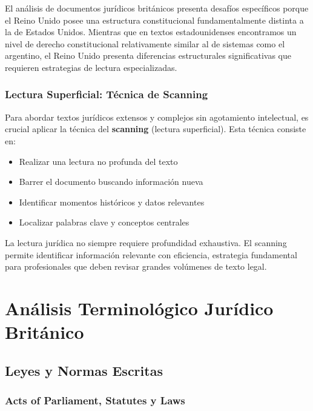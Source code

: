 \documentclass[12pt,oneside]{book}
\begin{document}
El análisis de documentos jurídicos británicos presenta desafíos específicos porque el Reino Unido posee una estructura constitucional fundamentalmente distinta a la de Estados Unidos. Mientras que en textos estadounidenses encontramos un nivel de derecho constitucional relativamente similar al de sistemas como el argentino, el Reino Unido presenta diferencias estructurales significativas que requieren estrategias de lectura especializadas.

\subsection{Lectura Superficial: Técnica de Scanning}

Para abordar textos jurídicos extensos y complejos sin agotamiento intelectual, es crucial aplicar la técnica del \textbf{scanning} (lectura superficial). Esta técnica consiste en:

\begin{itemize}
    \item Realizar una lectura no profunda del texto
    \item Barrer el documento buscando información nueva
    \item Identificar momentos históricos y datos relevantes
    \item Localizar palabras clave y conceptos centrales
\end{itemize}

La lectura jurídica no siempre requiere profundidad exhaustiva. El scanning permite identificar información relevante con eficiencia, estrategia fundamental para profesionales que deben revisar grandes volúmenes de texto legal.


\chapter{Análisis Terminológico Jurídico Británico}

\section{Leyes y Normas Escritas}

\subsection{Acts of Parliament, Statutes y Laws}
\end{document}

